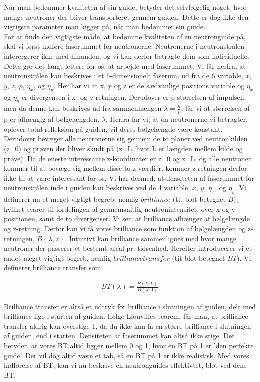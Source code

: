 \documentclass[12pt,oneside,a4paper]{article}
\begin{document}
{{{{{Når man bedømmer kvaliteten af sin guide, betyder det selvfølgelig noget, hvor mange neutroner der bliver transporteret gennem guiden. Dette er dog ikke den vigtigste parameter man kigger på, når man bedømmer sin guide. 
\\
For at finde den vigtigste måde, at bedømme kvaliteten af en neutronguide på, skal vi først indføre faserummet for neutronerne. Neutronerne i neutronstrålen interergerer ikke med hinanden, og vi kan derfor betragte dem som individuelle. Dette gør det langt lettere for os, at arbejde med faserummet. Vi får herfra, at neutronstrålen kan beskrives i et 6-dimensionelt faserum, ud fra de 6 variable, $x$, $y$, $z$, $p$, $\eta_x$, og $\eta_y$. Her har vi at x, y og z er de sædvanlige positions variable og $\eta_x$ og $\eta_y$ er divergensen i x- og y-retningen. Derudover er p størrelsen af impulsen, men da denne kan beskrives ud fra sammenhængen $\lambda=\frac{h}{p}$, får vi at størrelsen af p er afhængig af bølgelængden, $\lambda$. Herfra får vi, at da neutronerne vi betragter, oplever total refleksion på guiden, vil deres bølgelængde være konstant. Derudover bevæger alle neutronerne sig gennem de to planer ved neutronkilden (z=0) og prøven der bliver skudt på (z=L, hvor L er længden mellem kilde og prøve). Da de eneste interessante z-koordinater er z=0 og z=L, og alle neutroner kommer til at bevæge sig mellem disse to z-værdier, kommer z-retningen derfor ikke til at være interessant for os. Vi har dermed, at densiteten af faserummet for neutronstrålen inde i guiden kan beskrives ved de 4 variable,  $x$, $y$, $\eta_x$, og $\eta_y$. Vi definerer nu et meget vigtigt begreb, nemlig $brilliance$ (tit blot betegnet $B$), hvilket svarer til fordelingen af gennemsnitlig neutronintensitet, over x og y-positionen, samt de to divergenser. Vi ser, at brilliance afhænger af bølgelængde og z-retning. Derfor kan vi få vores brilliance som funktion af bølgelængden og z-retningen, $B(\lambda,z)$. Intuitivt kan brilliance sammenlignes med hvor mange neutroner der passerer et bestemt areal pr. tidsenhed. Herefter introducerer vi et andet meget vigtigt begreb, nemlig $brilliance transfer$ (tit blot betegnet $BT$). Vi definerer brilliance transfer som:

\begin{align}
BT(\lambda)=\frac{B(\lambda, L)}{B(\lambda,0)}
\end{align}

Brilliance transfer er altså et udtryk for brilliance i slutningen af guiden, delt med brilliance lige i starten af guiden. Ifølge Liouvilles teorem, får man, at brilliance transfer aldrig kan overstige 1, da du ikke kan få en større brilliance i slutningen af guiden, end i starten. Densiteten af faserummet kan altså ikke stige. Det betyder, at vores BT altid ligger mellem 0 og 1, hvor en BT på 1 er 'den perfekte guide'. Der vil dog altid være et tab, så en BT på 1 er ikke realistisk. Med vores indførelse af BT, kan vi nu beskrive en neutronguides effektivtet, blot ved dens BT. \cite{report:ess_optimizations}





}}}}}
\end{document}
